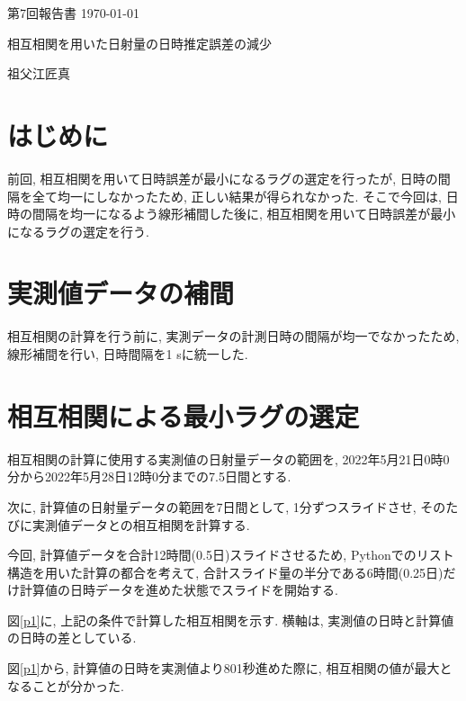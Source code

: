 \documentclass[a4j,12pt,]{jarticle}
\begin{document}
{\noindent\small 第7回報告書 \hfill\today}
\begin{center}
  {\Large 相互相関を用いた日射量の日時推定誤差の減少}
\end{center}
\begin{flushright}
  祖父江匠真 \\
\end{flushright}

\section{はじめに}
前回, 相互相関を用いて日時誤差が最小になるラグの選定を行ったが, 日時の間隔を全て均一にしなかったため, 正しい結果が得られなかった.
そこで今回は, 日時の間隔を均一になるよう線形補間した後に, 相互相関を用いて日時誤差が最小になるラグの選定を行う.

\section{実測値データの補間}
相互相関の計算を行う前に, 実測データの計測日時の間隔が均一でなかったため, 線形補間を行い, 日時間隔を1 \si{\second}に統一した.

\section{相互相関による最小ラグの選定}
相互相関の計算に使用する実測値の日射量データの範囲を, 2022年5月21日0時0分から2022年5月28日12時0分までの7.5日間とする.

次に, 計算値の日射量データの範囲を7日間として, 1分ずつスライドさせ, そのたびに実測値データとの相互相関を計算する.

今回, 計算値データを合計12時間(0.5日)スライドさせるため, Pythonでのリスト構造を用いた計算の都合を考えて, 合計スライド量の半分である6時間(0.25日)だけ計算値の日時データを進めた状態でスライドを開始する.

図\ref{p1}に, 上記の条件で計算した相互相関を示す.
横軸は, 実測値の日時と計算値の日時の差としている.

図\ref{p1}から, 計算値の日時を実測値より801秒進めた際に, 相互相関の値が最大となることが分かった.
\end{document}

